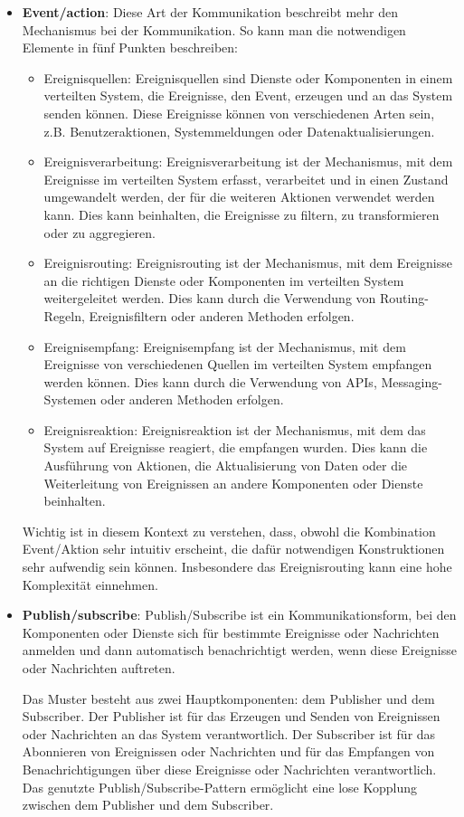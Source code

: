 \documentclass[../vs-script-first-v01.tex]{subfiles}
\begin{document}
\begin{itemize}
\item \textbf{Event/action}: Diese Art der Kommunikation beschreibt mehr den Mechanismus bei der Kommunikation. So kann man die notwendigen Elemente in fünf Punkten beschreiben:
\begin{itemize}
\item Ereignisquellen: Ereignisquellen sind Dienste oder Komponenten in einem verteilten System, die Ereignisse, den Event, erzeugen und an das System senden können. Diese Ereignisse können von verschiedenen Arten sein, z.B. Benutzeraktionen, Systemmeldungen oder Datenaktualisierungen.
\item Ereignisverarbeitung: Ereignisverarbeitung ist der Mechanismus, mit dem Ereignisse im verteilten System erfasst, verarbeitet und in einen Zustand umgewandelt werden, der für die weiteren Aktionen verwendet werden kann. Dies kann beinhalten, die Ereignisse zu filtern, zu transformieren oder zu aggregieren.
\item Ereignisrouting: Ereignisrouting ist der Mechanismus, mit dem Ereignisse an die richtigen Dienste oder Komponenten im verteilten System weitergeleitet werden. Dies kann durch die Verwendung von Routing-Regeln, Ereignisfiltern oder anderen Methoden erfolgen.
\item Ereignisempfang: Ereignisempfang ist der Mechanismus, mit dem Ereignisse von verschiedenen Quellen im verteilten System empfangen werden können. Dies kann durch die Verwendung von APIs, Messaging-Systemen oder anderen Methoden erfolgen.
\item Ereignisreaktion: Ereignisreaktion ist der Mechanismus, mit dem das System auf Ereignisse reagiert, die empfangen wurden. Dies kann die Ausführung von Aktionen, die Aktualisierung von Daten oder die Weiterleitung von Ereignissen an andere Komponenten oder Dienste beinhalten.
\end{itemize}
Wichtig ist in diesem Kontext zu verstehen, dass, obwohl die Kombination Event/Aktion sehr intuitiv erscheint, die dafür notwendigen Konstruktionen sehr aufwendig sein können. Insbesondere das Ereignisrouting kann eine hohe Komplexität einnehmen. 

\item \textbf{Publish/subscribe}: Publish/Subscribe ist ein Kommunikationsform, bei den Komponenten oder Dienste sich für bestimmte Ereignisse oder Nachrichten anmelden und dann automatisch benachrichtigt werden, wenn diese Ereignisse oder Nachrichten auftreten.

Das Muster besteht aus zwei Hauptkomponenten: dem Publisher und dem Subscriber. Der Publisher ist für das Erzeugen und Senden von Ereignissen oder Nachrichten an das System verantwortlich. Der Subscriber ist für das Abonnieren von Ereignissen oder Nachrichten und für das Empfangen von Benachrichtigungen über diese Ereignisse oder Nachrichten verantwortlich. Das genutzte Publish/Subscribe-Pattern ermöglicht eine lose Kopplung zwischen dem Publisher und dem Subscriber. 


\end{itemize}
\end{document}

